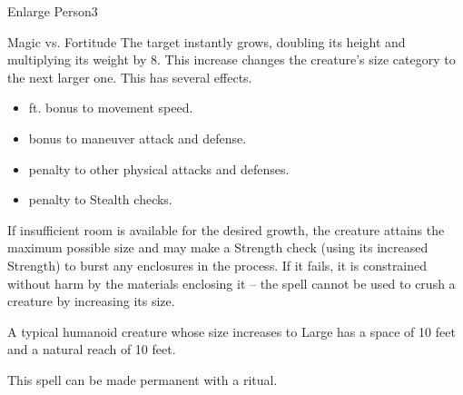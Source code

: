 \begin{spellsection}{Enlarge Person}{3}
\begin{spellheader}
\end{spellheader}
\begin{spellcontent}
    \begin{spelltargetinginfo}
    \end{spelltargetinginfo}
    \begin{spelleffects}
        \begin{spellattack}{Magic vs. Fortitude}
            \spellsuccess The target instantly grows, doubling its height and multiplying its weight by 8. This increase changes the creature's size category to the next larger one. This has several effects.
            \begin{itemize}
                \item {} ft. bonus to movement speed.
                \item {} bonus to maneuver attack and defense.
                \item {} penalty to other physical attacks and defenses.
                \item {} penalty to Stealth checks.
            \end{itemize}
            \par If insufficient room is available for the desired growth, the creature attains the maximum possible size and may make a Strength check (using its increased Strength) to burst any enclosures in the process. If it fails, it is constrained without harm by the materials enclosing it -- the spell cannot be used to crush a creature by increasing its size.
        \end{spellattack}
        \spelldur \durshort \dismissable
    \end{spelleffects}
\end{spellcontent}
\begin{spellfooter}
    \spellnotes A typical humanoid creature whose size increases to Large has a space of 10 feet and a natural reach of 10 feet. \sizingspellnotes

    This spell can be made permanent with a  ritual.
\end{spellfooter}
\end{spellsection}

